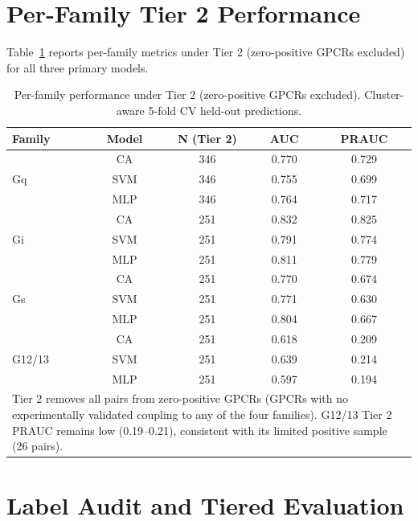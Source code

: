 \documentclass[11pt,a4paper]{article}
\begin{document}
\section{Per-Family Tier 2 Performance}

Table~\ref{tab:per_family_tier2} reports per-family metrics under Tier 2 (zero-positive GPCRs excluded) for all three primary models.

\begin{table}[h!]
\centering
\caption{Per-family performance under Tier 2 (zero-positive GPCRs excluded). Cluster-aware 5-fold CV held-out predictions.}
\label{tab:per_family_tier2}
\begin{tabular}{lcccc}
\toprule
Family & Model & N (Tier 2) & AUC & PRAUC \\
\midrule
\multirow{3}{*}{Gq}    & CA  & 346 & 0.770 & 0.729 \\
                        & SVM & 346 & 0.755 & 0.699 \\
                        & MLP & 346 & 0.764 & 0.717 \\
\midrule
\multirow{3}{*}{Gi}    & CA  & 251 & 0.832 & 0.825 \\
                        & SVM & 251 & 0.791 & 0.774 \\
                        & MLP & 251 & 0.811 & 0.779 \\
\midrule
\multirow{3}{*}{Gs}    & CA  & 251 & 0.770 & 0.674 \\
                        & SVM & 251 & 0.771 & 0.630 \\
                        & MLP & 251 & 0.804 & 0.667 \\
\midrule
\multirow{3}{*}{G12/13} & CA  & 251 & 0.618 & 0.209 \\
                        & SVM & 251 & 0.639 & 0.214 \\
                        & MLP & 251 & 0.597 & 0.194 \\
\bottomrule
\multicolumn{5}{p{0.88\textwidth}}{\small Tier 2 removes all pairs from zero-positive GPCRs (GPCRs with no experimentally validated coupling to any of the four families). G12/13 Tier 2 PRAUC remains low (0.19--0.21), consistent with its limited positive sample (26 pairs).} \\
\end{tabular}
\end{table}

\section{Label Audit and Tiered Evaluation}
\end{document}
